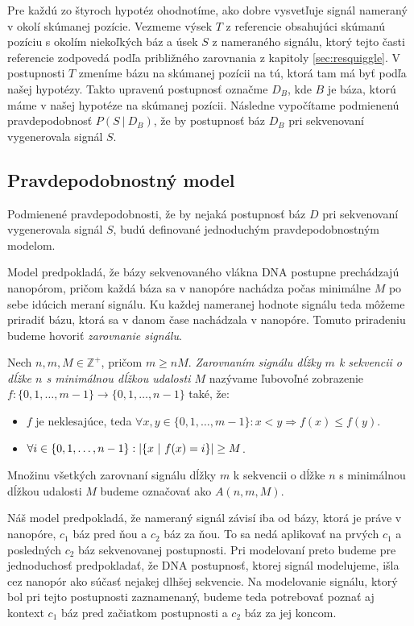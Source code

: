 Pre každú zo štyroch hypotéz ohodnotíme, ako dobre vysvetľuje signál nameraný v okolí skúmanej
pozície. Vezmeme výsek $T$ z referencie obsahujúci skúmanú pozíciu s okolím niekoľkých báz a úsek $S$
z nameraného signálu, ktorý tejto časti referencie zodpovedá podľa približného zarovnania 
z kapitoly \ref{sec:resquiggle}. V postupnosti $T$ zmeníme bázu na skúmanej pozícii na tú, ktorá 
tam má byť podľa našej hypotézy. Takto upravenú postupnosť označme $D_B$, kde $B$ je báza, ktorú
máme v našej hypotéze na skúmanej pozícii. 
Následne vypočítame podmienenú pravdepodobnosť $P(S ~|~ D_B)$, že by postupnosť báz $D_B$ pri sekvenovaní vygenerovala signál $S$.

\subsection{Pravdepodobnostný model}

Podmienené pravdepodobnosti, že by nejaká postupnosť báz $D$ pri sekvenovaní vygenerovala signál $S$,
budú definované jednoduchým pravdepodobnostným modelom.

Model predpokladá, že bázy sekvenovaného vlákna DNA postupne prechádzajú nanopórom, pričom
každá báza sa v nanopóre nachádza počas minimálne $M$ po sebe idúcich meraní signálu. Ku každej
nameranej hodnote signálu teda môžeme priradiť bázu, ktorá sa v danom čase nachádzala v nanopóre.
Tomuto priradeniu budeme hovoriť \emph{zarovnanie signálu}.

\begin{definicia}

Nech $n, m, M \in \mathbb{Z}^+$, pričom $m \geq n M$. \emph{Zarovnaním signálu dĺžky $m$ k sekvencii
o dĺžke $n$ s
 minimálnou dĺžkou udalosti $M$} nazývame ľubovoľné zobrazenie $f: \{0, 1, \dots, m-1\} \rightarrow \{0, 1, \dots, n-1\}$
také, že:

\begin{itemize}
\item $f$ je neklesajúce, teda $\forall x, y \in \{0, 1, \dots, m-1\}: x < y \Rightarrow f(x) \leq f(y)$.
\item $\forall i \in \{0, 1, \dots, n-1\}: \abs*{\{x ~|~ f(x) = i\}} \geq M$.
\end{itemize}

Množinu všetkých zarovnaní signálu dĺžky $m$ k sekvencii o dĺžke $n$ s minimálnou dĺžkou udalosti $M$ budeme označovať ako
$A(n, m, M)$.

\end{definicia}

Náš model predpokladá, že nameraný signál závisí iba od bázy, ktorá je práve v nanopóre, $c_1$
báz pred ňou a $c_2$ báz za ňou. To sa nedá aplikovať na prvých $c_1$ a posledných $c_2$ báz 
sekvenovanej postupnosti. Pri modelovaní preto budeme pre jednoduchosť predpokladať, že DNA postupnosť, 
ktorej signál modelujeme, išla cez nanopór ako súčasť nejakej dlhšej sekvencie. Na modelovanie
signálu, ktorý bol pri tejto postupnosti zaznamenaný, budeme teda potrebovať poznať aj 
kontext $c_1$ báz pred začiatkom postupnosti a $c_2$ báz za jej koncom.

